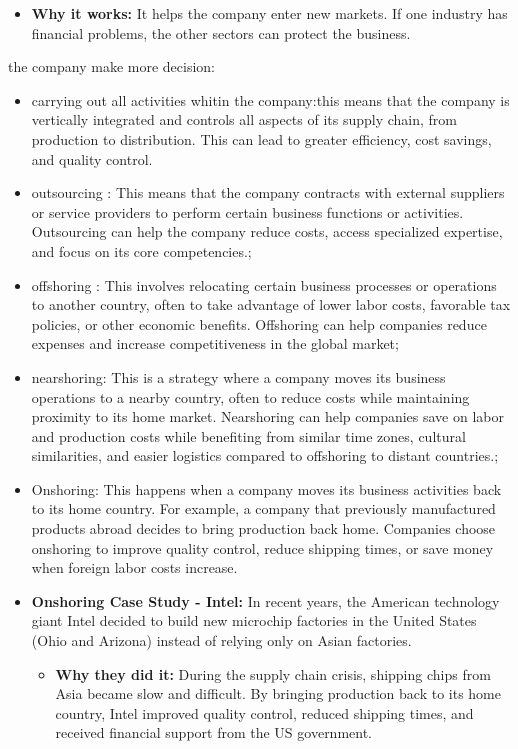 \documentclass[12pt,a4paper]{report}
\begin{document}
\begin{itemize}
    \item \textbf{Why it works:} It helps the company enter new markets. If one industry has financial problems, the other sectors can protect the business.
\end{itemize}
the company make more decision:
\begin{itemize}
    \item carrying out all activities whitin the company:this means that the company is vertically integrated and controls all aspects of its supply chain, from production to distribution. This can lead to greater efficiency, cost savings, and quality control.
    \item outsourcing : This means that the company contracts with external suppliers or service providers to perform certain business functions or activities. Outsourcing can help the company reduce costs, access specialized expertise, and focus on its core competencies.;
    \item offshoring : This involves relocating certain business processes or operations to another country, often to take advantage of lower labor costs, favorable tax policies, or other economic benefits. Offshoring can help companies reduce expenses and increase competitiveness in the global market;
    \item nearshoring: This is a strategy where a company moves its business operations to a nearby country, often to reduce costs while maintaining proximity to its home market. Nearshoring can help companies save on labor and production costs while benefiting from similar time zones, cultural similarities, and easier logistics compared to offshoring to distant countries.;
    \item Onshoring: This happens when a company moves its business activities back to its home country. For example, a company that previously manufactured products abroad decides to bring production back home. Companies choose onshoring to improve quality control, reduce shipping times, or save money when foreign labor costs increase.
\item \textbf{Onshoring Case Study - Intel:} In recent years, the American technology giant Intel decided to build new microchip factories in the United States (Ohio and Arizona) instead of relying only on Asian factories. 
\begin{itemize}
    \item \textbf{Why they did it:} During the supply chain crisis, shipping chips from Asia became slow and difficult. By bringing production back to its home country, Intel improved quality control, reduced shipping times, and received financial support from the US government.
\end{itemize}

\end{itemize}
\end{document}
